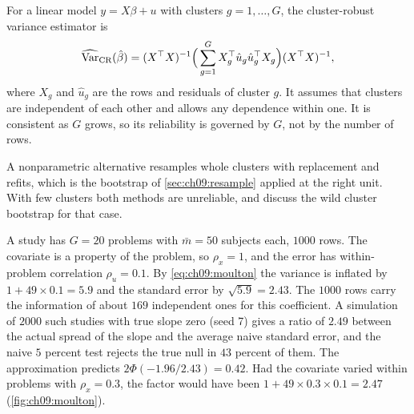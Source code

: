 \begin{definition}\label{def:ch09:crve}
For a linear model $y=X\beta+u$ with clusters $g=1,\dots,G$, the cluster-robust variance estimator is
\begin{equation}
\widehat{\operatorname{Var}}_{\text{CR}}(\hat\beta)=(X^{\top} X)^{-1}\Big(\sum_{g=1}^{G}X_g^{\top}\hat u_g\hat u_g^{\top} X_g\Big)(X^{\top} X)^{-1},
\label{eq:ch09:crve}
\end{equation}
where $X_g$ and $\hat u_g$ are the rows and residuals of cluster $g$. It assumes that clusters are independent of each other and allows any dependence within one. It is consistent as $G$ grows, so its reliability is governed by $G$, not by the number of rows.
\end{definition}
A nonparametric alternative resamples whole clusters with replacement and refits, which is the bootstrap of \cref{sec:ch09:resample} applied at the right unit. With few clusters both methods are unreliable, and \citet{cameronmiller2015} discuss the wild cluster bootstrap for that case.

\begin{example}\label{ex:ch09:cluster}
A study has $G=20$ problems with $\bar m=50$ subjects each, $1000$ rows. The covariate is a property of the problem, so $\rho_x=1$, and the error has within-problem correlation $\rho_u=0.1$. By \eqref{eq:ch09:moulton} the variance is inflated by $1+49\times0.1=5.9$ and the standard error by $\sqrt{5.9}=2.43$. The $1000$ rows carry the information of about $169$ independent ones for this coefficient. A simulation of $2000$ such studies with true slope zero (seed 7) gives a ratio of $2.49$ between the actual spread of the slope and the average naive standard error, and the naive $5$ percent test rejects the true null in $43$ percent of them. The approximation predicts $2\Phi(-1.96/2.43)=0.42$. Had the covariate varied within problems with $\rho_x=0.3$, the factor would have been $1+49\times0.3\times0.1=2.47$ (\cref{fig:ch09:moulton}).
\end{example}

